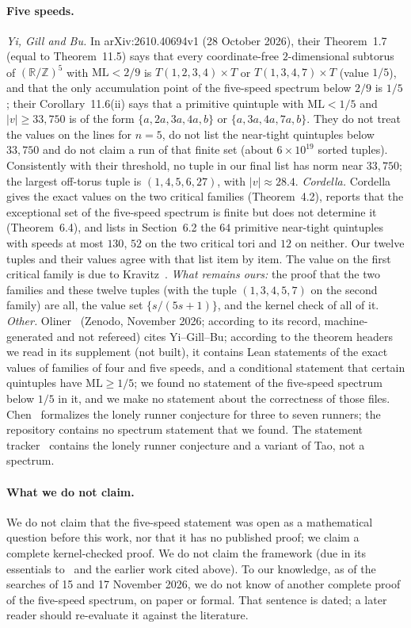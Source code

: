 \documentclass[11pt]{article}
\theoremstyle{remark}
\newcommand{\ML}{\mathrm{ML}}
\newcommand{\R}{\mathbb{R}}
\newcommand{\Z}{\mathbb{Z}}
\begin{document}
\paragraph{Five speeds.} \emph{Yi, Gill and Bu.} In arXiv:2610.40694v1 (28 October 2026), their Theorem~1.7 (equal to Theorem~11.5) says that every coordinate-free $2$-dimensional subtorus of $(\R/\Z)^5$ with $\ML<2/9$ is $T(1,2,3,4)\times T$ or $T(1,3,4,7)\times T$ (value $1/5$), and that the only accumulation point of the five-speed spectrum below $2/9$ is $1/5$; their Corollary~11.6(ii) says that a primitive quintuple with $\ML<1/5$ and $|v|\ge33{,}750$ is of the form $\{a,2a,3a,4a,b\}$ or $\{a,3a,4a,7a,b\}$. They do not treat the values on the lines for $n=5$, do not list the near-tight quintuples below $33{,}750$ and do not claim a run of that finite set (about $6\times10^{19}$ sorted tuples). Consistently with their threshold, no tuple in our final list has norm near $33{,}750$; the largest off-torus tuple is $(1,4,5,6,27)$, with $|v|\approx28.4$.
\emph{Cordella.} Cordella~\cite{Cordella} gives the exact values on the two critical families (Theorem~4.2), reports that the exceptional set of the five-speed spectrum is finite but does not determine it (Theorem~6.4), and lists in Section~6.2 the $64$ primitive near-tight quintuples with speeds at most $130$, $52$ on the two critical tori and $12$ on neither.
Our twelve tuples and their values agree with that list item by item. The value on the first critical family is due to Kravitz~\cite{Kravitz21}. \emph{What remains ours:} the proof that the two families and these twelve tuples (with the tuple $(1,3,4,5,7)$ on the second family) are all, the value set $\{s/(5s+1)\}$, and the kernel check of all of it.
\emph{Other.} Oliner~\cite{Oliner} (Zenodo, November 2026; according to its record, machine-generated and not refereed) cites Yi--Gill--Bu; according to the theorem headers we read in its supplement (not built), it contains Lean statements of the exact values of families of four and five speeds, and a conditional statement that certain quintuples have $\ML\ge1/5$; we found no statement of the five-speed spectrum below $1/5$ in it, and we make no statement about the correctness of those files. Chen~\cite{Chen} formalizes the lonely runner conjecture for three to seven runners; the repository contains no spectrum statement that we found. The statement tracker~\cite{FC} contains the lonely runner conjecture and a variant of Tao, not a spectrum.

\paragraph{What we do not claim.} We do not claim that the five-speed statement was open as a mathematical question before this work, nor that it has no published proof; we claim a complete kernel-checked proof. We do not claim the framework (due in its essentials to~\cite{YGB} and the earlier work cited above). To our knowledge, as of the searches of 15 and 17 November 2026, we do not know of another complete proof of the five-speed spectrum, on paper or formal. That sentence is dated; a later reader should re-evaluate it against the literature.
\end{document}
